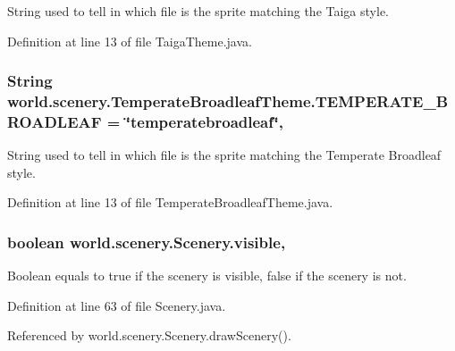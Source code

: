 String used to tell in which file is the sprite matching the Taiga style. 



Definition at line 13 of file Taiga\-Theme.\-java.

\hypertarget{a00030_a9e9253b684231327dd6ddeca5768033e}{
\subsubsection[{T\-E\-M\-P\-E\-R\-A\-T\-E\-\_\-\-B\-R\-O\-A\-D\-L\-E\-A\-F}]{\setlength{\rightskip}{0pt plus 5cm}String world.\-scenery.\-Temperate\-Broadleaf\-Theme.\-T\-E\-M\-P\-E\-R\-A\-T\-E\-\_\-\-B\-R\-O\-A\-D\-L\-E\-A\-F = \char`\"{}temperatebroadleaf\char`\"{}\hspace{0.3cm}{\ttfamily [static]}, {\ttfamily [inherited]}}}\label{a00030_a9e9253b684231327dd6ddeca5768033e}


String used to tell in which file is the sprite matching the Temperate Broadleaf style. 



Definition at line 13 of file Temperate\-Broadleaf\-Theme.\-java.

\hypertarget{a00024_a7b22a78d3126c947b7010fdbbea02218}{
\subsubsection[{visible}]{\setlength{\rightskip}{0pt plus 5cm}boolean world.\-scenery.\-Scenery.\-visible\hspace{0.3cm}{\ttfamily [protected]}, {\ttfamily [inherited]}}}\label{a00024_a7b22a78d3126c947b7010fdbbea02218}


Boolean equals to true if the scenery is visible, false if the scenery is not. 



Definition at line 63 of file Scenery.\-java.



Referenced by world.\-scenery.\-Scenery.\-draw\-Scenery().

